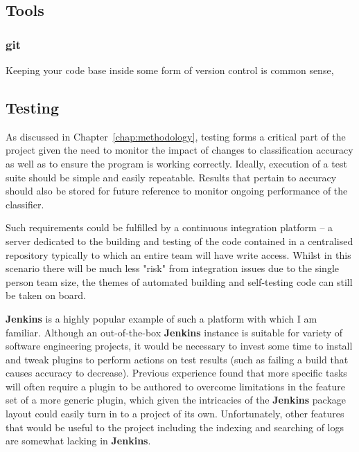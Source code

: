 \subsection{Tools}
\label{part1:dev:tools}

\subsubsection{git}

Keeping your code base inside some form of version control is common sense,



\subsection{Testing}
\label{sec:part1:testing}

As discussed in Chapter~\ref{chap:methodology}, testing forms a critical part of
the project given the need to monitor the impact of changes to classification
accuracy as well as to ensure the program is working correctly. Ideally,
execution of a test suite should be simple and easily repeatable. Results that
pertain to accuracy should also be stored for future reference to monitor
ongoing performance of the classifier.

Such requirements could be fulfilled by a continuous integration platform -- a
server dedicated to the building and testing of the code contained in a
centralised repository typically to which an entire team will have write
access\citep{fowler-ci}. Whilst in this scenario there will be much less "risk"
from integration issues due to the single person team size, the themes of
automated building and self-testing code can still be taken on board.

\textbf{Jenkins}\citep{Jenkins} is a highly popular\cite{jenkins-stats} example
of such a platform with which I am familiar. Although an out-of-the-box
\textbf{Jenkins} instance is suitable for variety of software engineering
projects, it would be necessary to invest some time to install and tweak plugins
to perform actions on test results (such as failing a build that causes accuracy
to decrease).  Previous experience found that more specific tasks will often
require a plugin to be authored to overcome limitations in the feature set of a
more generic plugin, which given the intricacies of the \textbf{Jenkins} package
layout could easily turn in to a project of its own. Unfortunately, other
features that would be useful to the project including the indexing and
searching of logs are somewhat lacking in \textbf{Jenkins}.

